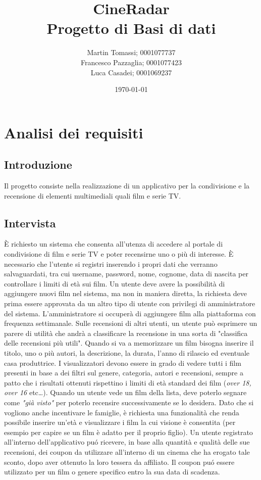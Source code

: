 \documentclass[a4paper,12pt]{report}
\title{\textbf{CineRadar}\\Progetto di Basi di dati}
\author{Martin Tomassi; 0001077737\\Francesco Pazzaglia; 0001077423\\Luca Casadei; 0001069237}
\date{\today}
\begin{document}
	\maketitle
	\tableofcontents
	\chapter{Analisi dei requisiti}
	\section{Introduzione}
	Il progetto consiste nella realizzazione di un applicativo per la condivisione e la recensione di elementi multimediali quali film e serie TV.
	\section{Intervista}
	È richiesto un sistema che consenta all'utenza di accedere al portale di condivisione di film e serie TV e poter recensirne uno o più di interesse. È necessario che l'utente si registri inserendo i propri dati che verranno salvaguardati, tra cui username, password, nome, cognome, data di nascita per controllare i limiti di età sui film. Un utente deve avere la possibilità di aggiungere nuovi film nel sistema, ma non in maniera diretta, la richiesta deve prima essere approvata da un altro tipo di utente con privilegi di amministratore del sistema. L'amministratore si occuperà di aggiungere film alla piattaforma con frequenza settimanale. Sulle recensioni di altri utenti, un utente può esprimere un parere di utilità che andrà a classificare la recensione in una sorta di "classifica delle recensioni più utili". Quando si va a memorizzare un film bisogna inserire il titolo, uno o più autori, la descrizione, la durata, l'anno di rilascio ed eventuale casa produttrice. I visualizzatori devono essere in grado di vedere tutti i film presenti in base a dei filtri sul genere, categoria, autori e recensioni, sempre a patto che i risultati ottenuti rispettino i limiti di età standard dei film (\textit{over 18, over 16} etc\dots). Quando un utente vede un film della lista, deve poterlo segnare come \textit{"già visto"} per poterlo recensire successivamente se lo desidera. Dato che si vogliono anche incentivare le famiglie, è richiesta una funzionalità che renda possibile inserire un'età e visualizzare i film la cui visione è consentita (per esempio per capire se un film è adatto per il proprio figlio). Un utente registrato all'interno dell'applicativo puó ricevere, in base alla quantità e qualità delle sue recensioni, dei coupon da utilizzare all'interno di un cinema che ha erogato tale sconto, dopo aver ottenuto la loro tessera da affiliato. Il coupon puó essere utilizzato per un film o genere specifico entro la sua data di scadenza.
\end{document}

